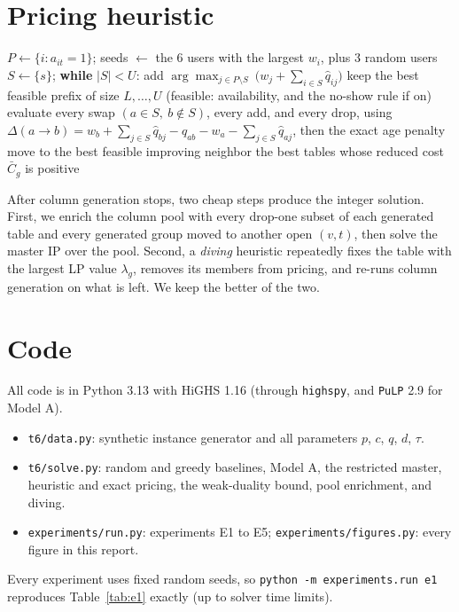 \section{Pricing heuristic}

\begin{algorithm}[h]
\caption{Heuristic pricing at $(v,t)$ with weights $w_i=(1+\sigma_i)c_{ivt}-\pi_i$ and $\hat q_{ij}=\tfrac12(2+\sigma_i+\sigma_j)q_{ij}$}
\label{alg:pricing}
\begin{algorithmic}[1]
\State $P\gets\{i: a_{it}=1\}$; seeds $\gets$ the 6 users with the largest $w_i$, plus 3 random users
  \State $S\gets\{s\}$; \textbf{while} $|S|<U$: add $\arg\max_{j\in P\setminus S}\ \bigl(w_j+\sum_{i\in S}\hat q_{ij}\bigr)$
  \State keep the best feasible prefix of size $L,\dots,U$ (feasible: availability, and the no-show rule if on)
  \Repeat {}
    \State evaluate every swap $(a\in S,\ b\notin S)$, every add, and every drop, using
    \Statex \hspace{\algorithmicindent} $\Delta(a\to b)=w_b+\sum_{j\in S}\hat q_{bj}-\hat q_{ab}-w_a-\sum_{j\in S}\hat q_{aj}$, then the exact age penalty
    \State move to the best feasible improving neighbor
\EndFor
\State \Return the best tables whose reduced cost $\bar C_g$ is positive
\end{algorithmic}
\end{algorithm}

\noindent After column generation stops, two cheap steps produce the integer solution. First, we enrich the column pool with every drop-one subset of each generated table and every generated group moved to another open $(v,t)$, then solve the master IP over the pool. Second, a \emph{diving} heuristic repeatedly fixes the table with the largest LP value $\lambda_g$, removes its members from pricing, and re-runs column generation on what is left. We keep the better of the two.

\section{Code}
All code is in Python 3.13 with HiGHS 1.16 (through \texttt{highspy}, and \texttt{PuLP} 2.9 for Model A).
\begin{itemize}
\item \texttt{t6/data.py}: synthetic instance generator and all parameters $p$, $c$, $q$, $d$, $\tau$.
\item \texttt{t6/solve.py}: random and greedy baselines, Model A, the restricted master, heuristic and exact pricing, the weak-duality bound, pool enrichment, and diving.
\item \texttt{experiments/run.py}: experiments E1 to E5; \texttt{experiments/figures.py}: every figure in this report.
\end{itemize}
Every experiment uses fixed random seeds, so \texttt{python -m experiments.run e1} reproduces Table~\ref{tab:e1} exactly (up to solver time limits).
